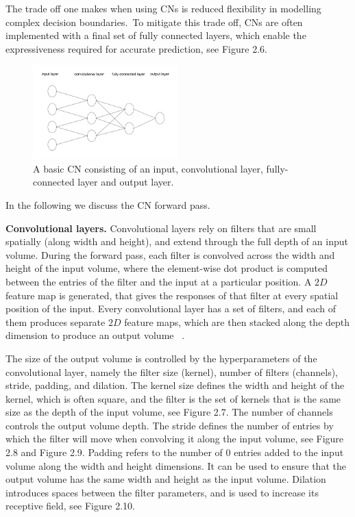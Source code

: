 \noindent The trade off one makes when using CNs is reduced flexibility in modelling complex decision boundaries.\ To mitigate this trade off, CNs are often implemented with a final set of fully connected layers, which enable the expressiveness required for accurate prediction, see Figure 2.6. \par

\begin{figure}[H]
   	\centering
    	\includegraphics[width=0.5\textwidth, height=0.3\textwidth]{convolutional_network}
	\captionsetup{justification=centering}
	\caption{A basic CN consisting of an input, convolutional layer, fully-connected layer and output layer.}
\end{figure}

\noindent In the following we discuss the CN forward pass. \par

\noindent \textbf{Convolutional layers.} Convolutional layers rely on filters that are small spatially (along width and height), and extend through the full depth of an input volume. During the forward pass, each filter is convolved across the width and height of the input volume, where the element-wise dot product is computed between the entries of the filter and the input at a particular position. A $ 2D $ feature map is generated, that gives the responses of that filter at every spatial position of the input. Every convolutional layer has a set of filters, and each of them produces separate $ 2D $ feature maps, which are then stacked along the depth dimension to produce an output volume \unskip ~\citep{DLIndaba2017}. \par

\noindent  The size of the output volume is controlled by the hyperparameters of the convolutional layer, namely the filter size (kernel), number of filters (channels), stride, padding, and dilation. The kernel size defines the width and height of the kernel, which is often square, and the filter is the set of kernels that is the same size as the depth of the input volume, see Figure 2.7. The number of channels controls the output volume depth. The stride defines the number of entries by which the filter will move when convolving it along the input volume, see Figure 2.8 and Figure 2.9. Padding refers to the number of $ 0 $ entries added to the input volume along the width and height dimensions. It can be used to ensure that the output volume has the same width and height as the input volume. Dilation introduces spaces between the filter parameters, and is used to increase its receptive field, see Figure 2.10. \par

